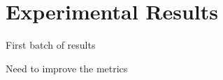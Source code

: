 
\chapter{Experimental Results} %

\label{Chapter7} %



First batch of results

Need to improve the metrics 
